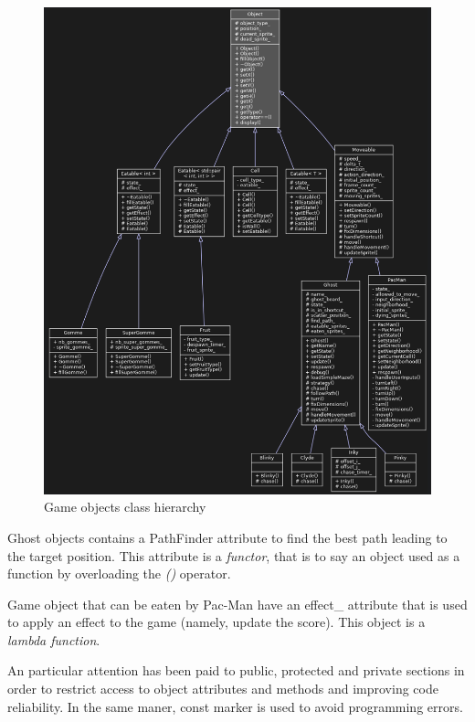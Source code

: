 \begin{figure}
    \center
    \includegraphics[scale=.22]{img/class_hierarchy.png}
    \caption{Game objects class hierarchy}
    \label{class_hierarchy}
\end{figure}

\textsf{Ghost} objects contains a \textsf{PathFinder} attribute to find the best path leading to the target position. This attribute is a \textit{functor}, that is to say an object used as a function by overloading the \textit{()} operator.

Game object that can be eaten by Pac-Man have an \textsf{effect\_} attribute that is used to apply an effect to the game (namely, update the score). This object is a \textit{lambda function}.

An particular attention has been paid to \textsf{public}, \textsf{protected} and \textsf{private} sections in order to restrict access to object attributes and methods and improving code reliability. In the same maner, \textsf{const} marker is used to avoid programming errors.

